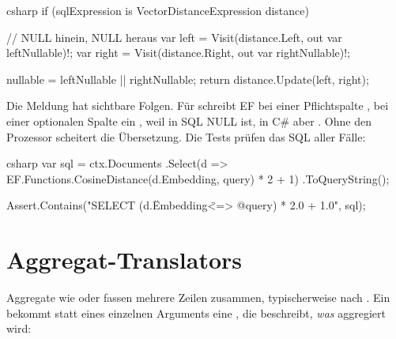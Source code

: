 \begin{sourcecode}{csharp}
if (sqlExpression is VectorDistanceExpression distance)
{
    // NULL hinein, NULL heraus
    var left = Visit(distance.Left, out var leftNullable)!;
    var right = Visit(distance.Right, out var rightNullable)!;

    nullable = leftNullable || rightNullable;
    return distance.Update(left, right);
}
\end{sourcecode}

Die Meldung hat sichtbare Folgen. Für
 schreibt EF bei einer Pflichtspalte , bei einer optionalen Spalte ein
, weil  in SQL NULL ist, in C\# aber
. Ohne den Prozessor scheitert die Übersetzung. Die Tests prüfen das SQL aller
Fälle:

\begin{sourcecode}{csharp}
var sql = ctx.Documents
    .Select(d => EF.Functions.CosineDistance(d.Embedding, query) * 2 + 1)
    .ToQueryString();

Assert.Contains("SELECT (d.\"Embedding\" <=> @query) * 2.0 + 1.0", sql);
\end{sourcecode}

\chapter{Aggregat-Translators}\label{ch:aggregate-translators}

Aggregate wie  oder  fassen mehrere Zeilen
zusammen, typischerweise nach . Ein
 bekommt statt
eines einzelnen Arguments eine , die beschreibt,
\emph{was} aggregiert wird:

